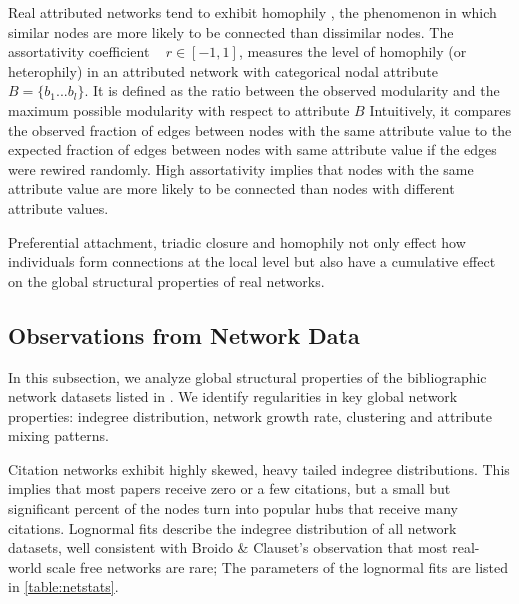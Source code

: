 
Real attributed networks tend to exhibit homophily
\cite{mcpherson2001birds}, the phenomenon in which similar nodes are more likely
to be connected than dissimilar nodes. The assortativity coefficient ~\cite{newman2002assortative}
$r \in [-1, 1]$, measures the level of homophily (or heterophily) in an attributed network with
categorical nodal attribute $B = \{b_1...b_l\}$.
It is defined as the ratio between the observed modularity and the maximum possible
modularity with respect to attribute $B$
Intuitively, it compares the observed fraction of edges between nodes with the same attribute
value to the expected fraction of edges between nodes with same
attribute value if the edges were rewired randomly.
High assortativity implies that nodes with the same
attribute value are more likely to be connected than nodes with different attribute values.


Preferential attachment, triadic closure and homophily not only effect how individuals
form connections at the local level but also have a cumulative effect on the
global structural properties of real networks.

\subsection{Observations from Network Data}
In this subsection, we analyze global structural properties of the bibliographic network datasets
listed in . We identify regularities in key global network properties:
indegree distribution, network growth rate, clustering and attribute mixing patterns.

Citation networks exhibit highly skewed, heavy tailed indegree distributions.
This implies that most papers receive zero or a few citations, but a small but
significant percent of the nodes turn into popular hubs that receive many
citations.
Lognormal fits describe the indegree distribution of all network datasets,
well consistent with Broido \& Clauset's \cite{broido2018scale} observation
that most real-world scale free networks are rare; The parameters of the lognormal
fits are listed in \cref{table:netstats}.

